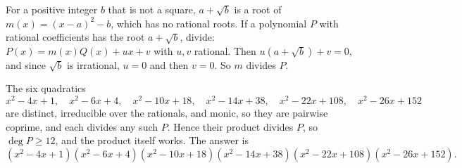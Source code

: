 For a positive integer $b$ that is not a square, $a+\sqrt b$ is a root of $m(x)=(x-a)^2-b$, which has no rational roots. If a polynomial $P$ with rational coefficients has the root $a+\sqrt b$, divide: $P(x)=m(x)Q(x)+ux+v$ with $u,v$ rational. Then $u\left(a+\sqrt b\right)+v=0$, and since $\sqrt b$ is irrational, $u=0$ and then $v=0$. So $m$ divides $P$.

The six quadratics
\[x^2-4x+1,\quad x^2-6x+4,\quad x^2-10x+18,\quad x^2-14x+38,\quad x^2-22x+108,\quad x^2-26x+152\]
are distinct, irreducible over the rationals, and monic, so they are pairwise coprime, and each divides any such $P$. Hence their product divides $P$, so $\deg P\ge12$, and the product itself works. The answer is
\[\boxed{\left(x^2-4x+1\right)\left(x^2-6x+4\right)\left(x^2-10x+18\right)\left(x^2-14x+38\right)\left(x^2-22x+108\right)\left(x^2-26x+152\right)}.\]
